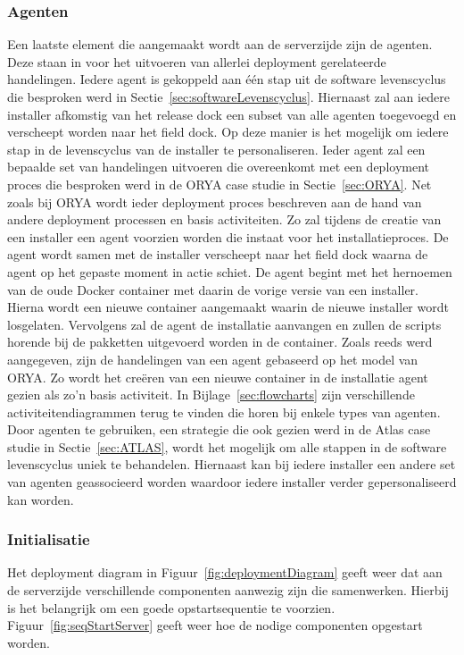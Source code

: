 \subsubsection{Agenten}
Een laatste element die aangemaakt wordt aan de serverzijde zijn de agenten.
Deze staan in voor het uitvoeren van allerlei deployment gerelateerde handelingen.
Iedere agent is gekoppeld aan één stap uit de software levenscyclus die besproken werd in Sectie~\ref{sec:softwareLevenscyclus}.
Hiernaast zal aan iedere installer afkomstig van het release dock een subset van alle agenten toegevoegd en verscheept worden naar het field dock.
Op deze manier is het mogelijk om iedere stap in de levenscyclus van de installer te personaliseren.
Ieder agent zal een bepaalde set van handelingen uitvoeren die overeenkomt met een deployment proces die besproken werd in de ORYA case studie in Sectie~\ref{sec:ORYA}.
Net zoals bij ORYA wordt ieder deployment proces beschreven aan de hand van andere deployment processen en basis activiteiten.
Zo zal tijdens de creatie van een installer een agent voorzien worden die instaat voor het installatieproces.
De agent wordt samen met de installer verscheept naar het field dock waarna de agent op het gepaste moment in actie schiet.
De agent begint met het hernoemen van de oude Docker container met daarin de vorige versie van een installer.
Hierna wordt een nieuwe container aangemaakt waarin de nieuwe installer wordt losgelaten.
Vervolgens zal de agent de installatie aanvangen en zullen de scripts horende bij de pakketten uitgevoerd worden in de container.
Zoals reeds werd aangegeven, zijn de handelingen van een agent gebaseerd op het model van ORYA.
Zo wordt het creëren van een nieuwe container in de installatie agent gezien als zo'n basis activiteit.
In Bijlage~\ref{sec:flowcharts} zijn verschillende activiteitendiagrammen terug te vinden die horen bij enkele types van agenten.
Door agenten te gebruiken, een strategie die ook gezien werd in de Atlas case studie in Sectie~\ref{sec:ATLAS}, wordt het mogelijk om alle stappen in de software levenscyclus uniek te behandelen.
Hiernaast kan bij iedere installer een andere set van agenten geassocieerd worden waardoor iedere installer verder gepersonaliseerd kan worden.

\subsubsection{Initialisatie}\label{sec:initServer}
Het deployment diagram in Figuur~\vref{fig:deploymentDiagram} geeft weer dat aan de serverzijde verschillende componenten aanwezig zijn die samenwerken.
Hierbij is het belangrijk om een goede opstartsequentie te voorzien.
Figuur~\vref{fig:seqStartServer} geeft weer hoe de nodige componenten opgestart worden.

